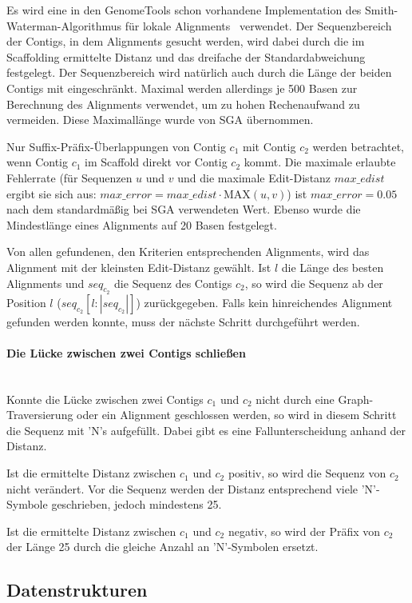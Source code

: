 \documentclass[a4paper,11pt,parskip]{scrartcl}
\begin{document}
Es wird eine in den GenomeTools schon vorhandene Implementation des
Smith-Waterman-Algorithmus für lokale Alignments~\cite{smith}
verwendet. Der Sequenzbereich der Contigs, in dem Alignments gesucht
werden, wird dabei durch die im Scaffolding ermittelte Distanz und das
dreifache der Standardabweichung festgelegt. Der Sequenzbereich wird
natürlich auch durch die Länge der beiden Contigs mit
eingeschränkt. Maximal werden allerdings je 500 Basen zur
Berechnung des Alignments verwendet, um zu hohen Rechenaufwand zu
vermeiden. Diese Maximallänge wurde von SGA übernommen.

Nur Suffix-Präfix-Überlappungen von Contig $c_1$ mit Contig $c_2$
werden betrachtet, wenn Contig $c_1$ im Scaffold direkt vor Contig
$c_2$ kommt. Die maximale erlaubte Fehlerrate (für Sequenzen $u$ und
$v$ und die maximale Edit-Distanz $max\_edist$ ergibt sie sich aus:
$max\_error = max\_edist \cdot \text{MAX}(u,v)$) ist $max\_error =
0.05$ nach dem standardmäßig bei SGA verwendeten Wert. Ebenso wurde
die Mindestlänge eines Alignments auf 20 Basen festgelegt.

Von allen gefundenen, den Kriterien entsprechenden Alignments, wird das
Alignment mit der kleinsten Edit-Distanz gewählt. Ist $l$ die Länge
des besten Alignments und $seq_{c_2}$ die Sequenz des Contigs $c_2$,
so wird die Sequenz ab der Position $l$ ($seq_{c_2}[l:|seq_{c_2}|]$)
zurückgegeben. Falls kein hinreichendes Alignment gefunden werden
konnte, muss der nächste Schritt durchgeführt werden.

\paragraph{Die Lücke zwischen zwei Contigs schließen}~\\
Konnte die Lücke zwischen zwei Contigs $c_1$ und $c_2$ nicht durch
eine Graph-Traversierung oder ein Alignment geschlossen werden, so wird
in diesem Schritt die Sequenz mit 'N's aufgefüllt. Dabei gibt es eine
Fallunterscheidung anhand der Distanz.

Ist die ermittelte Distanz zwischen $c_1$ und $c_2$ positiv, so wird
die Sequenz von $c_2$ nicht verändert. Vor die Sequenz werden der
Distanz entsprechend viele 'N'-Symbole geschrieben, jedoch mindestens
25.

Ist die ermittelte Distanz zwischen $c_1$ und $c_2$ negativ, so wird
der Präfix von $c_2$ der Länge 25 durch die gleiche Anzahl an
'N'-Symbolen ersetzt.

\subsection{Datenstrukturen}
\label{sec: Datenstrukturen}
\end{document}
